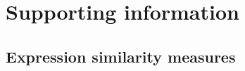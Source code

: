 \documentclass[10pt,letterpaper]{article}
\begin{document}
\nolinenumbers

%
%
%










\newpage
\section*{Supporting information}
\setcounter{figure}{0} \renewcommand{\thefigure}{S\arabic{figure}}
\renewcommand{\thefigure}{S\arabic{figure}}

\subsection*{Expression similarity measures}
\end{document}

